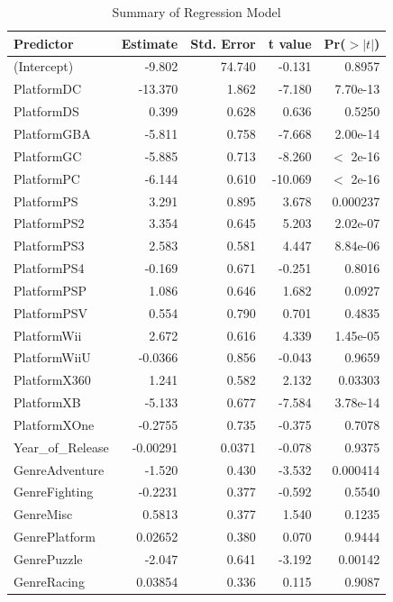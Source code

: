 \documentclass[12pt]{article}
\begin{document}
\begin{table}[ht]
  \caption{Summary of Regression Model}
  \label{tab:regression}
  \centering
  \begin{tabular}{lrrrr}
    \hline
    Predictor & Estimate & Std. Error & t value & Pr($>|t|$) \\
    \hline
    (Intercept) & -9.802 & 74.740 & -0.131 & 0.8957 \\
    PlatformDC & -13.370 & 1.862 & -7.180 & 7.70e-13 \\
    PlatformDS & 0.399 & 0.628 & 0.636 & 0.5250 \\
    PlatformGBA & -5.811 & 0.758 & -7.668 & 2.00e-14 \\
    PlatformGC & -5.885 & 0.713 & -8.260 & $<$ 2e-16 \\
    PlatformPC & -6.144 & 0.610 & -10.069 & $<$ 2e-16 \\
    PlatformPS & 3.291 & 0.895 & 3.678 & 0.000237 \\
    PlatformPS2 & 3.354 & 0.645 & 5.203 & 2.02e-07 \\
    PlatformPS3 & 2.583 & 0.581 & 4.447 & 8.84e-06 \\
    PlatformPS4 & -0.169 & 0.671 & -0.251 & 0.8016 \\
    PlatformPSP & 1.086 & 0.646 & 1.682 & 0.0927 \\
    PlatformPSV & 0.554 & 0.790 & 0.701 & 0.4835 \\
    PlatformWii & 2.672 & 0.616 & 4.339 & 1.45e-05 \\
    PlatformWiiU & -0.0366 & 0.856 & -0.043 & 0.9659 \\
    PlatformX360 & 1.241 & 0.582 & 2.132 & 0.03303 \\
    PlatformXB & -5.133 & 0.677 & -7.584 & 3.78e-14 \\
    PlatformXOne & -0.2755 & 0.735 & -0.375 & 0.7078 \\
    Year\_of\_Release & -0.00291 & 0.0371 & -0.078 & 0.9375 \\
    GenreAdventure & -1.520 & 0.430 & -3.532 & 0.000414 \\
    GenreFighting & -0.2231 & 0.377 & -0.592 & 0.5540 \\
    GenreMisc & 0.5813 & 0.377 & 1.540 & 0.1235 \\
    GenrePlatform & 0.02652 & 0.380 & 0.070 & 0.9444 \\
    GenrePuzzle & -2.047 & 0.641 & -3.192 & 0.00142 \\
    GenreRacing & 0.03854 & 0.336 & 0.115 & 0.9087 \\

\end{tabular}
\end{table}
\end{document}
